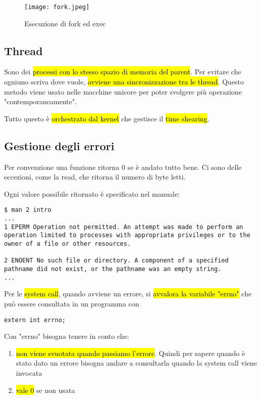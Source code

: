 \begin{figure}[H]
\centering
\texttt{[image: fork.jpeg]}
\caption{Esecuzione di fork ed exec} 
\label{fork}
\end{figure}


\subsection{Thread}

Sono dei \hl{processi con lo stesso spazio di memoria del parent}. Per evitare che ogniuno scriva dove vuole, \hl{avviene una sincronizzazione tra le thread}. Questo metodo viene usato nelle macchine unicore per poter svolgere più operazione "contemporaneamente".

Tutto questo è \hl{orchestrato dal kernel} che gestisce il \hl{time shearing}.


\subsection{Gestione degli errori}

Per convenzione una funzione ritorna 0 se è andato tutto bene. Ci sono delle eccezioni, come la read, che ritorna il numero di byte letti.

Ogni valore possibile ritornato è specificato nel manuale:

\begin{lstlisting}
$ man 2 intro
...
1 EPERM Operation not permitted. An attempt was made to perform an operation limited to processes with appropriate privileges or to the owner of a file or other resources.

2 ENOENT No such file or directory. A component of a specified pathname did not exist, or the pathname was an empty string.
...
\end{lstlisting}


Per le \hl{system call}, quando avviene un errore, si \hl{avvalora la variabile "errno"} che può essere consultata in un programma con 

\begin{lstlisting}
extern int errno;
\end{lstlisting}


Con "errno" bisogna tenere in conto che:

\begin{enumerate}
	\item \hl{non viene svuotata quando passiamo l'errore}. Quindi per sapere quando è stato dato un errore bisogna andare a consultarla quando la system call viene invocata
	\item \hl{vale 0} se non usata
\end{enumerate}


